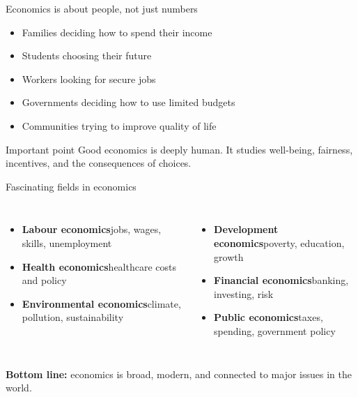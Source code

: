 \documentclass[aspectratio=169,11pt]{beamer}
\begin{document}
\begin{frame}{Economics is about people, not just numbers}
\begin{itemize}
    \item Families deciding how to spend their income
    \item Students choosing their future
    \item Workers looking for secure jobs
    \item Governments deciding how to use limited budgets
    \item Communities trying to improve quality of life
\end{itemize}
\vspace{0.5cm}
\begin{block}{Important point}
Good economics is deeply human. It studies well-being, fairness, incentives, and the consequences of choices.
\end{block}
\end{frame}

\begin{frame}{Fascinating fields in economics}
\begin{columns}[T,totalwidth=\textwidth]
\begin{itemize}
    \item \textbf{Labour economics}\newline jobs, wages, skills, unemployment
    \item \textbf{Health economics}\newline healthcare costs and policy
    \item \textbf{Environmental economics}\newline climate, pollution, sustainability
\end{itemize}
\begin{itemize}
    \item \textbf{Development economics}\newline poverty, education, growth
    \item \textbf{Financial economics}\newline banking, investing, risk
    \item \textbf{Public economics}\newline taxes, spending, government policy
\end{itemize}
\end{columns}
\vspace{0.4cm}
\textbf{Bottom line:} economics is broad, modern, and connected to major issues in the world.
\end{frame}
\end{document}
